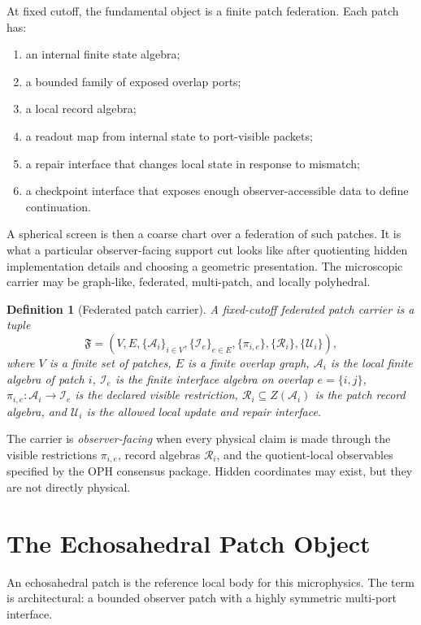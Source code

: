 \documentclass[11pt]{article}
\newtheorem{definition}[theorem]{Definition}
\theoremstyle{remark}
\theoremstyle{plain}
\begin{document}
At fixed cutoff, the fundamental object is a finite patch federation.
Each patch has:
\begin{enumerate}[leftmargin=2em]
\item an internal finite state algebra;
\item a bounded family of exposed overlap ports;
\item a local record algebra;
\item a readout map from internal state to port-visible packets;
\item a repair interface that changes local state in response to mismatch;
\item a checkpoint interface that exposes enough observer-accessible data to define continuation.
\end{enumerate}

A spherical screen is then a coarse chart over a federation of such patches. It is what a
particular observer-facing support cut looks like after quotienting hidden implementation details
and choosing a geometric presentation. The microscopic carrier may be graph-like, federated,
multi-patch, and locally polyhedral.

\begin{definition}[Federated patch carrier]
A fixed-cutoff federated patch carrier is a tuple
\[
\mathfrak F=(V,E,\{\mathcal A_i\}_{i\in V},\{\mathcal I_e\}_{e\in E},
\{\pi_{i,e}\},\{\mathcal R_i\},\{\mathcal U_i\}),
\]
where \(V\) is a finite set of patches, \(E\) is a finite overlap graph,
\(\mathcal A_i\) is the local finite algebra of patch \(i\), \(\mathcal I_e\) is the finite
interface algebra on overlap \(e=\{i,j\}\), \(\pi_{i,e}:\mathcal A_i\to\mathcal I_e\) is the
declared visible restriction, \(\mathcal R_i\subseteq Z(\mathcal A_i)\) is the patch record
algebra, and \(\mathcal U_i\) is the allowed local update and repair interface.
\end{definition}

The carrier is \emph{observer-facing} when every physical claim is made through the visible
restrictions \(\pi_{i,e}\), record algebras \(\mathcal R_i\), and the quotient-local observables
specified by the OPH consensus package. Hidden coordinates may exist, but they are not directly
physical.

\section{The Echosahedral Patch Object}

An echosahedral patch is the reference local body for this microphysics. The term is architectural:
a bounded observer patch with a highly symmetric multi-port interface.
\end{document}
